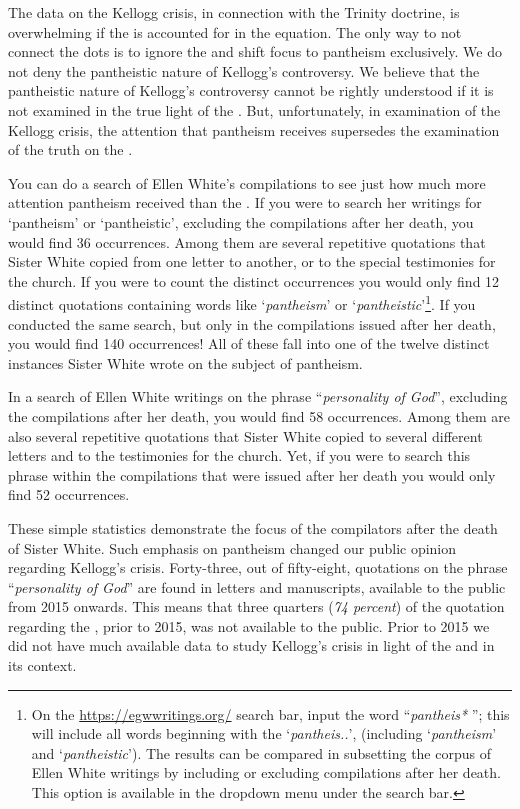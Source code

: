 The data on the Kellogg crisis, in connection with the Trinity doctrine, is overwhelming if the  is accounted for in the equation. The only way to not connect the dots is to ignore the  and shift focus to pantheism exclusively. We do not deny the pantheistic nature of Kellogg's controversy. We believe that the pantheistic nature of Kellogg's controversy cannot be rightly understood if it is not examined in the true light of the . But, unfortunately, in examination of the Kellogg crisis, the attention that pantheism receives supersedes the examination of the truth on the .

You can do a search of Ellen White’s compilations to see just how much more attention pantheism received than the . If you were to search her writings for ‘pantheism’ or ‘pantheistic’, excluding the compilations after her death, you would find 36 occurrences. Among them are several repetitive quotations that Sister White copied from one letter to another, or to the special testimonies for the church. If you were to count the distinct occurrences you would only find 12 distinct quotations containing words like ‘\textit{pantheism}’ or ‘\textit{pantheistic}’\footnote{On the \href{https://egwwritings.org/}{https://egwwritings.org/} search bar, input the word “\textit{pantheis*} ”; this will include all words beginning with the ‘\textit{pantheis..}’, (including ‘\textit{pantheism}’ and ‘\textit{pantheistic}’). The results can be compared in subsetting the corpus of Ellen White writings by including or excluding compilations after her death. This option is available in the dropdown menu under the search bar.}. If you conducted the same search, but only in the compilations issued after her death, you would find 140 occurrences! All of these fall into one of the twelve distinct instances Sister White wrote on the subject of pantheism.

In a search of Ellen White writings on the phrase “\textit{personality of God}”, excluding the compilations after her death, you would find 58 occurrences. Among them are also several repetitive quotations that Sister White copied to several different letters and to the testimonies for the church. Yet, if you were to search this phrase within the compilations that were issued after her death you would only find 52 occurrences.

These simple statistics demonstrate the focus of the compilators after the death of Sister White. Such emphasis on pantheism changed our public opinion regarding Kellogg’s crisis. Forty-three, out of fifty-eight, quotations on the phrase “\textit{personality of God}” are found in letters and manuscripts, available to the public from 2015 onwards. This means that three quarters (\textit{74 percent}) of the quotation regarding the , prior to 2015, was not available to the public. Prior to 2015 we did not have much available data to study Kellogg's crisis in light of the  and in its context.
